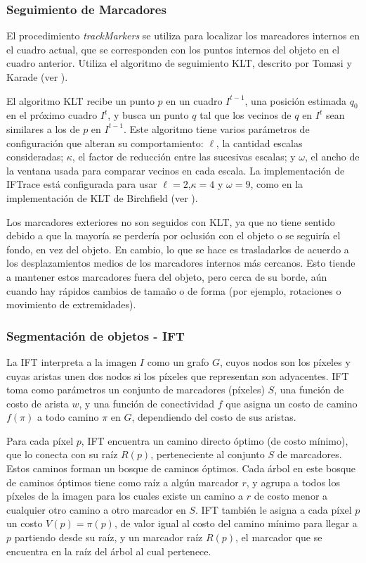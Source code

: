 \subsubsection{Seguimiento de Marcadores}

El procedimiento \textit{trackMarkers} se utiliza para localizar los marcadores
internos en el cuadro actual, que se corresponden con los puntos internos del objeto
en el cuadro anterior. Utiliza el algoritmo de seguimiento KLT, descrito por Tomasi y
Karade (ver \cite{KLT}).

El algoritmo KLT recibe un punto $p$ en un cuadro $I^{t-1}$, una posición estimada
$q_{0}$ en el próximo cuadro $I^{t}$, y busca un punto $q$ tal que los vecinos
de $q$ en $I^{t}$ sean similares a los de $p$ en $I^{t-1}$. Este algoritmo tiene
varios parámetros de configuración que alteran su comportamiento: $\ell$, la cantidad
escalas consideradas; $\kappa$, el factor de reducción entre las sucesivas escalas; y
$\omega$, el ancho de la ventana usada para comparar vecinos en cada escala.
La implementación de IFTrace está configurada para usar $\ell=2$,$\kappa=4$ y
$\omega=9$, como en la implementación de KLT de Birchfield (ver \cite{Birchfield-KLT-implementation}).

Los marcadores exteriores no son seguidos con KLT, ya que no tiene sentido debido
a que la mayoría se perdería por oclusión con el objeto o se seguiría el fondo, en
vez del objeto. En cambio, lo que se hace es trasladarlos de acuerdo a los
desplazamientos medios de los marcadores internos más cercanos. Esto tiende
a mantener estos marcadores fuera del objeto, pero cerca de su borde, aún cuando
hay rápidos cambios de tamaño o de forma (por ejemplo, rotaciones o movimiento de extremidades).

\subsubsection{Segmentación de objetos - IFT}

La IFT interpreta a la imagen $I$ como un grafo $G$, cuyos nodos son los
píxeles y cuyas aristas unen dos nodos si los píxeles que representan son
adyacentes. IFT toma como parámetros un conjunto de marcadores (píxeles) $S$,
una función de costo de arista $w$, y una función de conectividad $f$ que
asigna un costo de camino $f(\pi)$ a todo camino $\pi$ en $G$, dependiendo del
costo de sus aristas.

Para cada píxel $p$, IFT encuentra un camino directo óptimo (de costo mínimo),
que lo conecta con su raíz $R(p)$, perteneciente al conjunto $S$ de marcadores.
Estos caminos forman un bosque de caminos óptimos. Cada árbol en este bosque de
caminos óptimos tiene como raíz a algún marcador $r$, y agrupa a todos los
píxeles de la imagen para los cuales existe un camino a $r$ de costo menor
a cualquier otro camino a otro marcador en $S$. IFT también le asigna a cada
píxel $p$ un costo $V(p) = \pi(p)$, de valor igual al costo del camino mínimo
para llegar a $p$ partiendo desde su raíz, y un marcador raíz $R(p)$, el
marcador que se encuentra en la raíz del árbol al cual pertenece.

